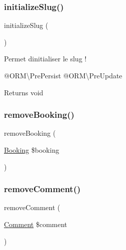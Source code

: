 \subsubsection{\texorpdfstring{initializeSlug()}{initializeSlug()}}
{\footnotesize\ttfamily initialize\+Slug (\begin{DoxyParamCaption}{ }\end{DoxyParamCaption})}

Permet d\textquotesingle{}initialiser le slug !

@\+O\+RM\textbackslash{}\+Pre\+Persist @\+O\+RM\textbackslash{}\+Pre\+Update

\begin{DoxyReturn}{Returns}
void 
\end{DoxyReturn}
\mbox{\label{class_app_1_1_entity_1_1_ad_a5b4bef85b0d6ad2c0129284d14b5d2d8}} 
\subsubsection{\texorpdfstring{removeBooking()}{removeBooking()}}
{\footnotesize\ttfamily remove\+Booking (\begin{DoxyParamCaption}\item[{\mbox{\hyperlink{class_app_1_1_entity_1_1_booking}{Booking}}}]{\$booking }\end{DoxyParamCaption})}

\mbox{\label{class_app_1_1_entity_1_1_ad_aa6b3ffd74acaea9a5314d2cfdadae4a1}} 
\subsubsection{\texorpdfstring{removeComment()}{removeComment()}}
{\footnotesize\ttfamily remove\+Comment (\begin{DoxyParamCaption}\item[{\mbox{\hyperlink{class_app_1_1_entity_1_1_comment}{Comment}}}]{\$comment }\end{DoxyParamCaption})}

\mbox{\label{class_app_1_1_entity_1_1_ad_ab3f007ff609fce4fe853b782702c5d36}} 
